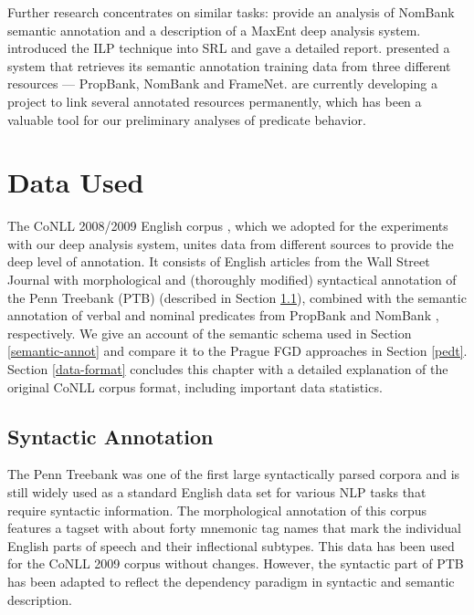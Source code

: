 \documentclass[12pt,notitlepage]{report}
\begin{document}
Further research concentrates on similar tasks: \citet{jiang06} provide an analysis of NomBank \citep{meyers04} semantic annotation and a description of a MaxEnt deep analysis system. \citet{punyakanok04} introduced the ILP technique into SRL and gave a detailed report. \citet{giuglea06} presented a system that retrieves its semantic annotation training data from three different resources --- PropBank, NomBank and FrameNet. \citet{loper07} are currently developing a project to link several annotated resources permanently, which has been a valuable tool for our preliminary analyses of predicate behavior. 

%
%
\chapter{Data Used}\label{data}
%
%

The CoNLL 2008/2009 English corpus \citep{surdeanu08,hajic09}, which we adopted for the experiments with our deep analysis system, unites data from different sources to provide the deep level of annotation. It consists of English articles from the Wall Street Journal with morphological and (thoroughly modified) syntactical annotation of the Penn Treebank (PTB) \citep{marcus93} (described in Section \ref{synt-annot}), combined with the semantic annotation of verbal and nominal predicates from PropBank \citep{palmer05} and NomBank \citep{meyers04}, respectively. We give an account of the semantic schema used in Section \ref{semantic-annot} and compare it to the Prague FGD approaches in Section \ref{pedt}. Section \ref{data-format} concludes this chapter with a detailed explanation of the original CoNLL corpus format, including important data statistics.

\section{Syntactic Annotation}\label{synt-annot}

The Penn Treebank was one of the first large syntactically parsed corpora and is still widely used as a standard English data set for various NLP tasks that require syntactic information. The morphological annotation of this corpus features a tagset \citep{santorini90} with about forty mnemonic tag names that mark the individual English parts of speech and their inflectional subtypes. This data has been used for the CoNLL 2009 corpus without changes. However, the syntactic part of PTB has been adapted to reflect the dependency paradigm in syntactic and semantic description.
\end{document}

